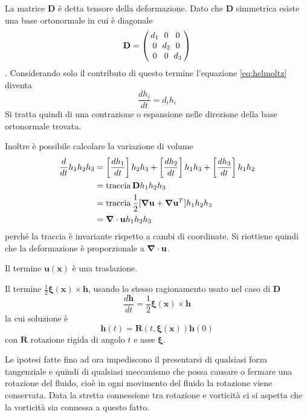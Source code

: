 La matrice $\mathbf{D}$ è detta tensore della deformazione. Dato che $\mathbf{D}$ simmetrica esiste una base ortonormale in cui è diagonale
\begin{equation}
\mathbf{D}={\setlength\arraycolsep{2pt} 
\left(\begin{array}{ccc} 
d_1 & 0 & 0 \\ 
0 & d_2 & 0 \\ 
0 & 0 & d_3 \\
\end{array}\right) 
}
\end{equation}.
Considerando solo il contributo di questo termine l'equazione \ref{eq:helmoltz} diventa 
$$\frac{d h_i}{dt} = d_i h_i$$
Si tratta quindi di una contrazione o espansione nelle direzione della base ortonormale trovata.

Inoltre è possibile calcolare la variazione di volume
\begin{equation}
\begin{split}
\frac{d}{dt}h_1 h_2 h_3 &= \left [ \frac{dh_1}{dt} \right ] h_2h_3 + \left [ \frac{dh_2}{dt} \right ] h_1h_3 + \left [ \frac{dh_3}{dt} \right ] h_1h_2 \\
                                        &= \operatorname{traccia} \mathbf{D} h_1 h_2 h_3  \\
                                        &= \operatorname{traccia}  \frac{1}{2} [ \boldsymbol{\nabla}\mathbf{u} + \boldsymbol{\nabla}\mathbf{u} ^T] h_1 h_2 h_3 \\ 
                                        &= \boldsymbol{\nabla} \cdot \mathbf{u} h_1 h_2 h_3
\end{split}
\end{equation}
perché la traccia è invariante rispetto a cambi di coordinate. Si riottiene quindi che la deformazione è proporzionale a $ \boldsymbol{\nabla} \cdot \mathbf{u}$.

Il termine $\mathbf{u}(\mathbf{x})$ è una traslazione.

Il termine $\frac{1}{2}\boldsymbol{\xi}(\mathbf{x})\times\mathbf{h}$, usando lo stesso ragionamento usato nel caso di $\mathbf{D}$
$$\frac{d\mathbf{h}}{dt}=\frac{1}{2}\boldsymbol{\xi}(\mathbf{x})\times\mathbf{h}$$
la cui soluzione è
$$\mathbf{h}(t)=\mathbf{R}(t,\boldsymbol{\xi}(\mathbf{x}))\mathbf{h}(0)$$
con $\mathbf{R}$ rotazione rigida di angolo $t$ e asse $\boldsymbol{\xi}$. 

Le ipotesi fatte fino ad ora impediscono il presentarsi di qualsiasi forza tangenziale e quindi di qualsiasi meccanismo che possa causare o fermare una rotazione del fluido, cioè in ogni movimento del fluido la rotazione viene conservata. Data la stretta connessione tra rotazione e vorticità ci si aspetta che la vorticità sia connessa a questo fatto. 


